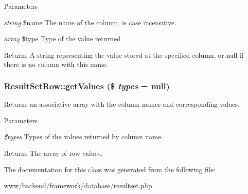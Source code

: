 \begin{DoxyParams}{Parameters}
\item[{\em string}]\$name The name of the column, is case incensitive. \item[{\em array}]\$type Type of the value returned\end{DoxyParams}
\begin{DoxyReturn}{Returns}
A string representing the value stored at the specified column, or null if there is no column with this name. 
\end{DoxyReturn}
\hypertarget{classResultSetRow_aee1015a9b3975eab92106353dd2bae58}{
\subsubsection[{getValues}]{\setlength{\rightskip}{0pt plus 5cm}ResultSetRow::getValues (\$ {\em types} = {\ttfamily null})}}
\label{classResultSetRow_aee1015a9b3975eab92106353dd2bae58}
Returns an associative array with the column names and corresponding values.


\begin{DoxyParams}{Parameters}
\item[{\em \$types}]Types of the values returned by column name.\end{DoxyParams}
\begin{DoxyReturn}{Returns}
The array of row values. 
\end{DoxyReturn}


The documentation for this class was generated from the following file:\begin{DoxyCompactItemize}
\item 
www/backend/framework/database/resultset.php\end{DoxyCompactItemize}
